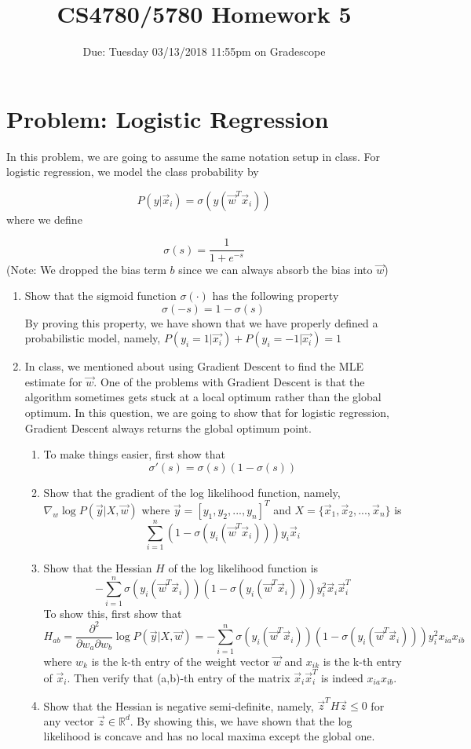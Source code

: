 \documentclass[11pt]{article}
\title{CS4780/5780 Homework 5}
\author{Due: Tuesday 03/13/2018 11:55pm on Gradescope}
\date{}
\begin{document}
		\maketitle
		\section*{Problem: Logistic Regression}
		In this problem, we are going to assume the same notation setup in class. For logistic regression, we model the class probability by 
		
		$$P(y|\vec{x}_i) = \sigma(y(\vec{w}^T\vec{x}_i))$$ where we define 
		
		$$\sigma(s) = \frac{1}{1 + e^{-s}}$$
		(Note: We dropped the bias term $b$ since we can always absorb the bias into $\vec{w}$)
		\begin{enumerate}
			\item Show that the sigmoid function $\sigma(\cdot)$ has the following property $$\sigma(-s) = 1 - \sigma(s)$$ By proving this property, we have shown that we have properly defined a probabilistic model, namely, $P(y_i = 1| \vec{x_i}) + P(y_i = -1| \vec{x_i}) = 1$  
			\item In class, we mentioned about using Gradient Descent to find the MLE estimate for $\vec{w}$. One of the problems with Gradient Descent is that the algorithm sometimes gets stuck at a local optimum rather than the global optimum. In this question, we are going to show that for logistic regression, Gradient Descent always returns the global optimum point. 
			\begin{enumerate}
				\item To make things easier, first show that $$\sigma'(s) = \sigma(s) (1-\sigma(s))$$
				\item Show that the  gradient of the log likelihood function, namely, $\nabla_w \log P(\vec{y} | X, \vec{w})$ where $\vec{y} = [y_1, y_2, ..., y_n]^T$ and $X = \{\vec{x}_1,\vec{x}_2 ,...,\vec{x}_n \}$ is 
				$$\sum_{i = 1}^{n} (1 - \sigma(y_i(\vec{w}^T\vec{x}_i)))y_i \vec{x}_i$$
				\item Show that the Hessian $H$ of the log likelihood function is 
				$$-\sum_{i = 1}^{n} \sigma(y_i(\vec{w}^T\vec{x}_i))(1 - \sigma(y_i(\vec{w}^T\vec{x}_i)))y_i^2 \vec{x}_i\vec{x}_i^T$$
				To show this, first show that  
				$$H_{ab} = \frac{\partial^2}{\partial w_a \partial w_b} \log P(\vec{y} | X, \vec{w}) = -\sum_{i = 1}^{n} \sigma(y_i(\vec{w}^T\vec{x}_i))(1 - \sigma(y_i(\vec{w}^T\vec{x}_i)))y_i^2 x_{ia}x_{ib}$$ 
				where $w_k$ is the k-th entry of the weight vector $\vec{w}$ and $x_{ik}$ is the k-th entry of $\vec{x}_i$. Then verify that (a,b)-th entry of the matrix $\vec{x}_i \vec{x}_i ^T$ is indeed $x_{ia}x_{ib}$. 
				\item Show that the Hessian is negative semi-definite, namely, $\vec{z}^TH\vec{z} \leq 0$ for any vector $\vec{z} \in \mathbb{R}^d$. By showing this, we have shown that the log likelihood is concave and has no local maxima except the global one. 
			\end{enumerate}
		\end{enumerate}
\end{document}
